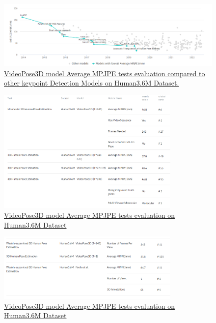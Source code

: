 \begin{figure}[h]
	\centering
	\includegraphics[width=1\textwidth]{figures/Evaluation/VideoPose3Dcomparison.png}
	\captionsetup{labelformat=empty}
	\caption{\href{https://paperswithcode.com/sota/3d-human-pose-estimation-on-human36m}
	{VideoPose3D model Average MPJPE tests evaluation compared to other keypoint Detection Models on Human3.6M Dataset.}}
\end{figure}

\pagebreak

\begin{figure}[h]
	\centering
	\includegraphics[width=0.8\textwidth]{figures/Evaluation/EvaluationVideoPose3D1.png}
	\captionsetup{labelformat=empty}
	\caption{\href{https://paperswithcode.com/paper/3d-human-pose-estimation-in-video-with}
	{VideoPose3D model Average MPJPE tests evaluation on Human3.6M Dataset}}
\end{figure}

\begin{figure}[h]
	\centering
	\includegraphics[width=0.8\textwidth]{figures/Evaluation/EvaluationVideoPose3D2.png}
	\captionsetup{labelformat=empty}
	\caption{\href{https://paperswithcode.com/paper/3d-human-pose-estimation-in-video-with}
	{VideoPose3D model Average MPJPE tests evaluation on Human3.6M Dataset}}
\end{figure}